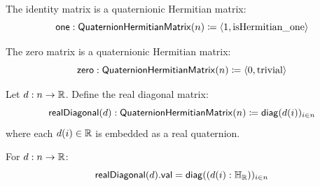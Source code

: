 \begin{definition}[one]
The identity matrix is a quaternionic Hermitian matrix:
\[ \mathsf{one} : \mathsf{QuaternionHermitianMatrix}(n) \coloneqq \langle 1, \text{isHermitian\_one} \rangle \]
\end{definition}

\begin{definition}[zero]
The zero matrix is a quaternionic Hermitian matrix:
\[ \mathsf{zero} : \mathsf{QuaternionHermitianMatrix}(n) \coloneqq \langle 0, \text{trivial} \rangle \]
\end{definition}

\begin{definition}[realDiagonal]
Let $d : n \to \mathbb{R}$. Define the real diagonal matrix:
\[ \mathsf{realDiagonal}(d) : \mathsf{QuaternionHermitianMatrix}(n) \coloneqq \mathsf{diag}(d(i))_{i \in n} \]
where each $d(i) \in \mathbb{R}$ is embedded as a real quaternion.
\end{definition}

\begin{lemma}
For $d : n \to \mathbb{R}$:
\[ \mathsf{realDiagonal}(d).\mathsf{val} = \mathsf{diag}((d(i) : \mathbb{H}_{\mathbb{R}}))_{i \in n} \]
\end{lemma}
